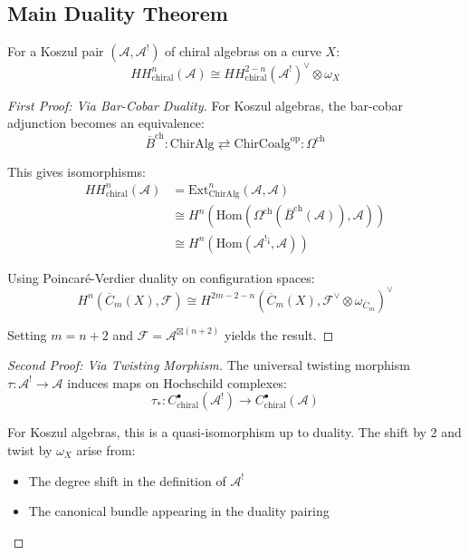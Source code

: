 \subsection{Main Duality Theorem}

\begin{theorem}
\label{thm:main-koszul-hoch}
For a Koszul pair $(\mathcal{A}, \mathcal{A}^!)$ of chiral algebras on a curve $X$:
\[
HH^n_{\text{chiral}}(\mathcal{A}) \cong HH^{2-n}_{\text{chiral}}(\mathcal{A}^!)^{\vee} \otimes \omega_X
\]
\end{theorem}

\begin{proof}[First Proof: Via Bar-Cobar Duality]
For Koszul algebras, the bar-cobar adjunction becomes an equivalence:
\[
\overline{B}^{\text{ch}}: \text{ChirAlg} \rightleftarrows \text{ChirCoalg}^{\text{op}}: \Omega^{\text{ch}}
\]

This gives isomorphisms:
\begin{align}
HH^n_{\text{chiral}}(\mathcal{A}) &= \text{Ext}^n_{\text{ChirAlg}}(\mathcal{A}, \mathcal{A}) \\
&\cong H^n(\text{Hom}(\Omega^{\text{ch}}(\overline{B}^{\text{ch}}(\mathcal{A})), \mathcal{A})) \\
&\cong H^n(\text{Hom}(\mathcal{A}^!{}^{\text{¡}}, \mathcal{A}))
\end{align}

Using Poincaré-Verdier duality on configuration spaces:
\[
H^n(\overline{C}_m(X), \mathcal{F}) \cong H^{2m-2-n}(\overline{C}_m(X), \mathcal{F}^{\vee} \otimes \omega_{\overline{C}_m})^{\vee}
\]

Setting $m = n+2$ and $\mathcal{F} = \mathcal{A}^{\boxtimes (n+2)}$ yields the result.
\end{proof}

\begin{proof}[Second Proof: Via Twisting Morphism]
The universal twisting morphism $\tau: \mathcal{A}^! \to \mathcal{A}$ induces maps on Hochschild complexes:
\[
\tau_*: C^{\bullet}_{\text{chiral}}(\mathcal{A}^!) \to C^{\bullet}_{\text{chiral}}(\mathcal{A})
\]

For Koszul algebras, this is a quasi-isomorphism up to duality. The shift by 2 and twist by $\omega_X$ arise from:
\begin{itemize}
\item The degree shift in the definition of $\mathcal{A}^!$
\item The canonical bundle appearing in the duality pairing
\end{itemize}
\end{proof}

